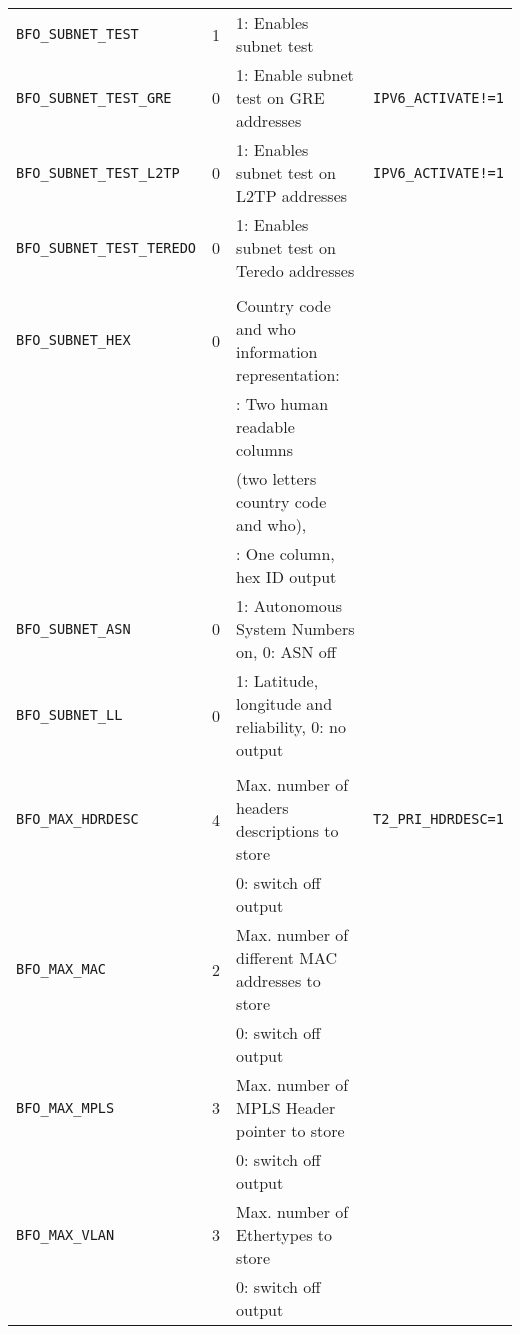 \documentclass[documentation]{subfiles}
\begin{document}
\begin{longtable}{lcll}
    {\tt\small BFO\_SUBNET\_TEST}         & 1 & 1: Enables subnet test                     & \\
    {\tt\small BFO\_SUBNET\_TEST\_GRE}    & 0 & 1: Enable subnet test on GRE addresses     & {\tt\small IPV6\_ACTIVATE!=1}\\
    {\tt\small BFO\_SUBNET\_TEST\_L2TP}   & 0 & 1: Enables subnet test on L2TP addresses   & {\tt\small IPV6\_ACTIVATE!=1}\\
    {\tt\small BFO\_SUBNET\_TEST\_TEREDO} & 0 & 1: Enables subnet test on Teredo addresses & \\\\

    {\tt\small BFO\_SUBNET\_HEX}          & 0 & Country code and who information representation:\\
                                          &   & \qquad 0: Two human readable columns\\
                                          &   & \qquad    (two letters country code and who),\\
                                          &   & \qquad 1: One column, hex ID output\\
    {\tt\small BFO\_SUBNET\_ASN}	      & 0 & 1: Autonomous System Numbers on, 0: ASN off\\
    {\tt\small BFO\_SUBNET\_LL}           & 0 & 1: Latitude, longitude and reliability, 0: no output\\\\

    {\tt\small BFO\_MAX\_HDRDESC}         & 4 & Max. number of headers descriptions to store & {\tt\small T2\_PRI\_HDRDESC=1}\\
                                          &   & 0: switch off output\\
    {\tt\small BFO\_MAX\_MAC}             & 2 & Max. number of different MAC addresses to store\\
                                          &   & 0: switch off output\\
    {\tt\small BFO\_MAX\_MPLS}            & 3 & Max. number of MPLS Header pointer to store\\
                                          &   & 0: switch off output\\
    {\tt\small BFO\_MAX\_VLAN}            & 3 & Max. number of Ethertypes to store\\
                                          &   & 0: switch off output\\
    \bottomrule
\end{longtable}
\end{document}
